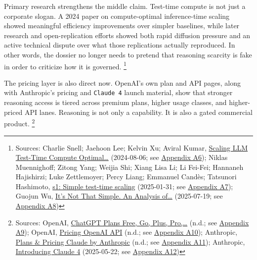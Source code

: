 \documentclass[
  american,
  11pt,
  letterpaper,
]{article}
\begin{document}
Primary research strengthens the middle claim. Test-time compute is not
just a corporate slogan. A 2024 paper on compute-optimal inference-time
scaling showed meaningful efficiency improvements over simpler
baselines, while later research and open-replication efforts showed both
rapid diffusion pressure and an active technical dispute over what those
replications actually reproduced. In other words, the dossier no longer
needs to pretend that reasoning scarcity is fake in order to criticize
how it is governed. \footnote{Sources: Charlie Snell; Jaehoon Lee;
  Kelvin Xu; Aviral Kumar,
  \href{https://arxiv.org/abs/2408.03314}{Scaling LLM Test-Time Compute
  Optimal\ldots{}} (2024-08-06; see
  \hyperref[ch-06-appendix-a6-scaling-llm-test-time-compute-optimally-can-be-more-effective-than-scaling-model-parameters]{Appendix
  A6}); Niklas Muennighoff; Zitong Yang; Weijia Shi; Xiang Lisa Li; Li
  Fei-Fei; Hannaneh Hajishirzi; Luke Zettlemoyer; Percy Liang; Emmanuel
  Candès; Tatsunori Hashimoto,
  \href{https://arxiv.org/abs/2501.19393}{s1: Simple test-time scaling}
  (2025-01-31; see
  \hyperref[ch-06-appendix-a7-s1-simple-test-time-scaling]{Appendix
  A7}); Guojun Wu, \href{https://arxiv.org/abs/2507.14419}{It's Not That
  Simple. An Analysis of\ldots{}} (2025-07-19; see
  \hyperref[ch-06-appendix-a8-it-s-not-that-simple-an-analysis-of-simple-test-time-scaling]{Appendix
  A8})}

The pricing layer is also direct now. OpenAI's own plan and API pages,
along with Anthropic's pricing and \texttt{Claude\ 4} launch material,
show that stronger reasoning access is tiered across premium plans,
higher usage classes, and higher-priced API lanes. Reasoning is not only
a capability. It is also a gated commercial product. \footnote{Sources:
  OpenAI, \href{https://chatgpt.com/pricing/}{ChatGPT Plans \textbar{}
  Free, Go, Plus, Pro,\ldots{}} (n.d.; see
  \hyperref[ch-06-appendix-a9-chatgpt-plans-free-go-plus-pro-business-and-enterprise]{Appendix
  A9}); OpenAI,
  \href{https://developers.openai.com/api/docs/pricing}{Pricing
  \textbar{} OpenAI API} (n.d.; see
  \hyperref[ch-06-appendix-a10-pricing-openai-api]{Appendix A10});
  Anthropic, \href{https://claude.com/pricing}{Plans \& Pricing
  \textbar{} Claude by Anthropic} (n.d.; see
  \hyperref[ch-06-appendix-a11-plans-pricing-claude-by-anthropic]{Appendix
  A11}); Anthropic,
  \href{https://www.anthropic.com/news/claude-4}{Introducing Claude 4}
  (2025-05-22; see
  \hyperref[ch-06-appendix-a12-introducing-claude-4]{Appendix A12})}
\end{document}
